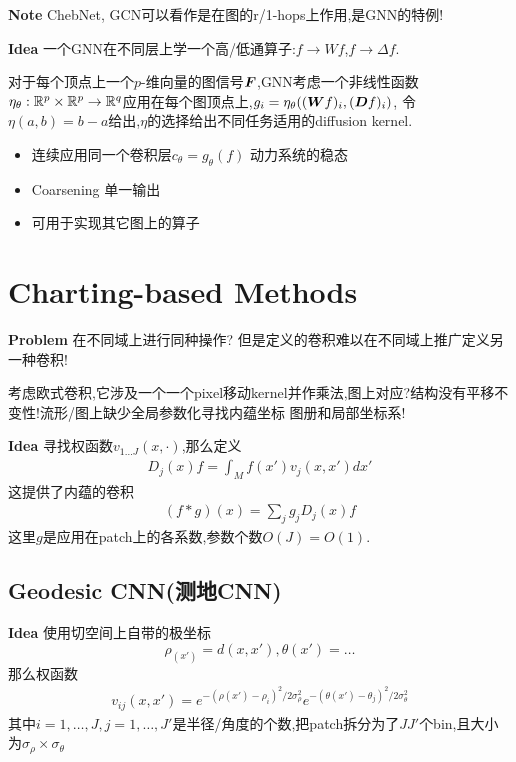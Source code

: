 \documentclass{article}
\begin{document}
\textbf{Note} ChebNet, GCN可以看作是在图的r/1-hops上作用,是GNN的特例!

\textbf{Idea} 一个GNN在不同层上学一个高/低通算子:$f\rightarrow Wf$,$f\rightarrow \Delta f$.

对于每个顶点上一个$p$-维向量的图信号$\boldsymbol{F}$,GNN考虑一个非线性函数$\eta_\theta:\mathbb{R}^p\times\mathbb{R}^p\rightarrow\mathbb{R}^q$应用在每个图顶点上,$g_i=\eta_\theta((\boldsymbol{W} f)_i,(\boldsymbol{D} f)_i)$,
令$\eta(a,b)=b-a$给出\lop,$\eta$的选择给出不同任务适用的diffusion kernel.

\begin{itemize}
    \item 连续应用同一个卷积层$c_\theta=g_\theta(f)$ \tRarr 动力系统的稳态
    \item Coarsening \tRarr 单一输出
    \item 可用于实现其它图上的算子
\end{itemize}

\section{Charting-based Methods}

\textbf{Problem} 在不同域上进行同种操作?
但是定义的卷积难以在不同域上推广\tRarr 定义另一种卷积!

考虑欧式卷积,它涉及一个一个pixel移动kernel并作乘法,图上对应?结构没有平移不变性!流形/图上缺少全局参数化\tRarr 寻找内蕴坐标 \tRarr 图册和局部坐标系!

\textbf{Idea} 寻找权函数$v_{1\dots J}(x,\cdot)$,那么定义
\begin{align}
    \label{d1}
    D_j(x)f=\int_Mf(x')v_j(x,x')dx'
\end{align}
这提供了内蕴的卷积
\begin{align}
    \label{d2}
    (f*g)(x)=\sum_j g_jD_j(x)f
\end{align}
这里$g$是应用在patch上的各系数,参数个数$O(J)=O(1)$.

\subsection{Geodesic CNN(测地CNN)}

\textbf{Idea} 使用切空间上自带的极坐标
$$\rho_(x')=d(x,x'),\theta(x')=\dots$$
那么权函数
\begin{align}
    v_{ij}(x,x')=e^{-(\rho(x')-\rho_i)^2/2\sigma_\rho^2}e^{-(\theta(x')-\theta_j)^2/2\sigma_\theta^2}
\end{align}
其中$i=1,\dots,J,j=1,\dots,J'$是半径/角度的个数,把patch拆分为了$J J'$个bin,且大小为$\sigma_\rho\times \sigma_\theta$
\end{document}
